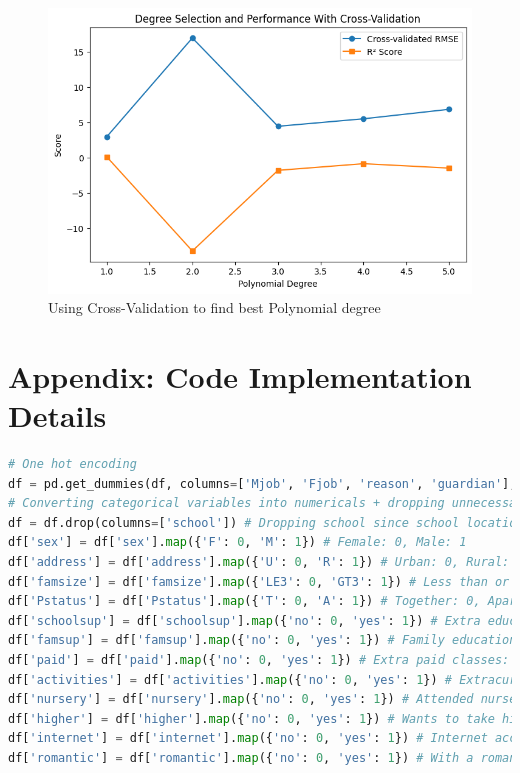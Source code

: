 \documentclass[11pt,a4paper]{article}
\begin{document}
\begin{figure} [H]
\centering %
\includegraphics[width=15cm]{poly_degree_cv.png}
\caption{Using Cross-Validation to find best Polynomial degree}
\label{fig:polydegreecv}
\end{figure}

\section{Appendix: Code Implementation Details}
\label{sec:code}
\begin{lstlisting}[language=Python, caption=Encoding Code Snippet]
# One hot encoding
df = pd.get_dummies(df, columns=['Mjob', 'Fjob', 'reason', 'guardian'], drop_first=True)
# Converting categorical variables into numericals + dropping unnecessary columns
df = df.drop(columns=['school']) # Dropping school since school location should not affect much in our scope
df['sex'] = df['sex'].map({'F': 0, 'M': 1}) # Female: 0, Male: 1
df['address'] = df['address'].map({'U': 0, 'R': 1}) # Urban: 0, Rural: 1
df['famsize'] = df['famsize'].map({'LE3': 0, 'GT3': 1}) # Less than or equal to 3: 0, Greater than 3: 1
df['Pstatus'] = df['Pstatus'].map({'T': 0, 'A': 1}) # Together: 0, Apart: 1
df['schoolsup'] = df['schoolsup'].map({'no': 0, 'yes': 1}) # Extra educational support: 0 if no, 1 if yes
df['famsup'] = df['famsup'].map({'no': 0, 'yes': 1}) # Family educational support: 0 if no, 1 if yes
df['paid'] = df['paid'].map({'no': 0, 'yes': 1}) # Extra paid classes: 0 if no, 1 if yes
df['activities'] = df['activities'].map({'no': 0, 'yes': 1}) # Extracurricular activities: 0 if no, 1 if yes
df['nursery'] = df['nursery'].map({'no': 0, 'yes': 1}) # Attended nursery school: 0 if no, 1 if yes
df['higher'] = df['higher'].map({'no': 0, 'yes': 1}) # Wants to take higher education: 0 if no, 1 if yes
df['internet'] = df['internet'].map({'no': 0, 'yes': 1}) # Internet access at home: 0 if no, 1 if yes
df['romantic'] = df['romantic'].map({'no': 0, 'yes': 1}) # With a romantic relationship: 0 if no, 1 if yes
\end{lstlisting}
\end{document}
